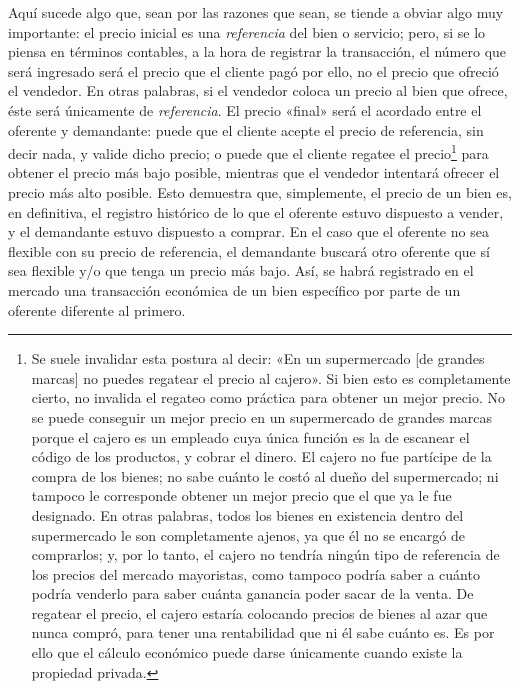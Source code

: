 \documentclass[12pt,a4paper,twoside]{book}
\begin{document}
Aquí sucede algo que, sean por las razones que sean, se tiende a obviar algo muy importante: el precio inicial es una \textit{referencia} del bien o servicio; pero, si se lo piensa en términos contables, a la hora de registrar la transacción, el número que será ingresado será el precio que el cliente pagó por ello, no el precio que ofreció el vendedor. En otras palabras, si el vendedor coloca un precio al bien que ofrece, éste será únicamente de \textit{referencia}. El precio «final» será el acordado entre el oferente y demandante: puede que el cliente acepte el precio de referencia, sin decir nada, y valide dicho precio; o puede que el cliente regatee el precio\footnote{Se suele invalidar esta postura al decir: «En un supermercado [de grandes marcas] no puedes regatear el precio al cajero». Si bien esto es completamente cierto, no invalida el regateo como práctica para obtener un mejor precio. No se puede conseguir un mejor precio en un supermercado de grandes marcas porque el cajero es un empleado cuya única función es la de escanear el código de los productos, y cobrar el dinero. El cajero no fue partícipe de la compra de los bienes; no sabe cuánto le costó al dueño del supermercado; ni tampoco le corresponde obtener un mejor precio que el que ya le fue designado. En otras palabras, todos los bienes en existencia dentro del supermercado le son completamente ajenos, ya que él no se encargó de comprarlos; y, por lo tanto, el cajero no tendría ningún tipo de referencia de los precios del mercado mayoristas, como tampoco podría saber a cuánto podría venderlo para saber cuánta ganancia poder sacar de la venta. De regatear el precio, el cajero estaría colocando precios de bienes al azar que nunca compró, para tener una rentabilidad que ni él sabe cuánto es. Es por ello que el cálculo económico puede darse únicamente cuando existe la propiedad privada.} para obtener el precio más bajo posible, mientras que el vendedor intentará ofrecer el precio más alto posible. Esto demuestra que, simplemente, el precio de un bien es, en definitiva, el registro histórico de lo que el oferente estuvo dispuesto a vender, y el demandante estuvo dispuesto a comprar. En el caso que el oferente no sea flexible con su precio de referencia, el demandante buscará otro oferente que sí sea flexible y/o que tenga un precio más bajo. Así, se habrá registrado en el mercado una transacción económica de un bien específico por parte de un oferente diferente al primero.
\end{document}
